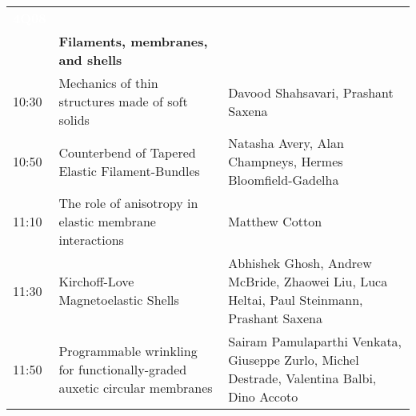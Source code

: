 \begin{tabularx}{\linewidth}{C{15mm}YP{50mm}}
\textcolor{white}{\textbf{4Q08}} & & \\
& \textbf{Filaments, membranes, and shells} & \\
10:30 & Mechanics of thin structures made of soft solids & Davood Shahsavari, Prashant Saxena\\
10:50 & Counterbend of Tapered Elastic Filament-Bundles & Natasha Avery, Alan Champneys, Hermes Bloomfield-Gadelha\\
11:10 & The role of anisotropy in elastic membrane interactions & Matthew Cotton\\
11:30 & Kirchoff-Love Magnetoelastic Shells & Abhishek Ghosh, Andrew McBride, Zhaowei Liu, Luca Heltai, Paul Steinmann, Prashant Saxena\\
11:50 & Programmable wrinkling for functionally-graded auxetic circular membranes & Sairam Pamulaparthi Venkata, Giuseppe Zurlo, Michel Destrade, Valentina Balbi, Dino Accoto\\
\end{tabularx}

